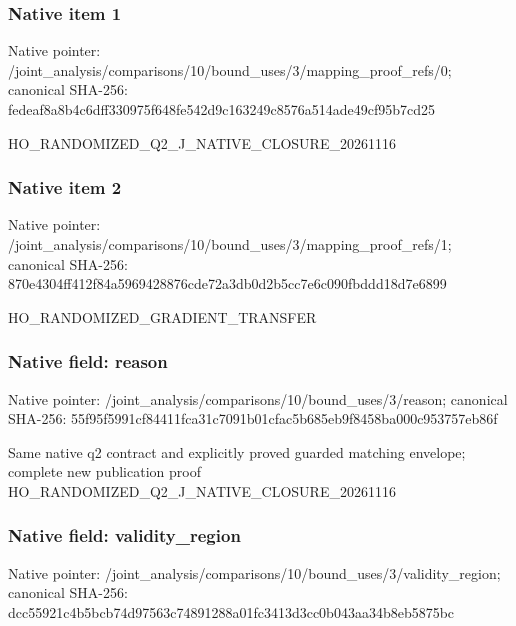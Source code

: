 \documentclass[10pt,a4paper]{article}
\begin{document}
\subsubsection{Native item 1}
Native pointer: /joint\_\allowbreak{}analysis/comparisons/10/bound\_\allowbreak{}uses/3/mapping\_\allowbreak{}proof\_\allowbreak{}refs/0; canonical SHA-256: fedeaf8a8b4c6dff330975f648fe542d9c163249c8576a514ade49cf95b7cd25

\begingroup\raggedright\sloppy HO\_\allowbreak{}RANDOMIZED\_\allowbreak{}Q2\_\allowbreak{}J\_\allowbreak{}NATIVE\_\allowbreak{}CLOSURE\_\allowbreak{}20261116\par\endgroup

\subsubsection{Native item 2}
Native pointer: /joint\_\allowbreak{}analysis/comparisons/10/bound\_\allowbreak{}uses/3/mapping\_\allowbreak{}proof\_\allowbreak{}refs/1; canonical SHA-256: 870e4304ff412f84a5969428876cde72a3db0d2b5cc7e6c090fbddd18d7e6899

\begingroup\raggedright\sloppy HO\_\allowbreak{}RANDOMIZED\_\allowbreak{}GRADIENT\_\allowbreak{}TRANSFER\par\endgroup

\subsubsection{Native field: reason}
Native pointer: /joint\_\allowbreak{}analysis/comparisons/10/bound\_\allowbreak{}uses/3/reason; canonical SHA-256: 55f95f5991cf84411fca31c7091b01cfac5b685eb9f8458ba000c953757eb86f

\begingroup\raggedright\sloppy Same native q2 contract and explicitly proved guarded matching envelope;\allowbreak{} complete new publication proof HO\_\allowbreak{}RANDOMIZED\_\allowbreak{}Q2\_\allowbreak{}J\_\allowbreak{}NATIVE\_\allowbreak{}CLOSURE\_\allowbreak{}20261116\par\endgroup

\subsubsection{Native field: validity\_\allowbreak{}region}
Native pointer: /joint\_\allowbreak{}analysis/comparisons/10/bound\_\allowbreak{}uses/3/validity\_\allowbreak{}region; canonical SHA-256: dcc55921c4b5bcb74d97563c74891288a01fc3413d3cc0b043aa34b8eb5875bc
\end{document}

